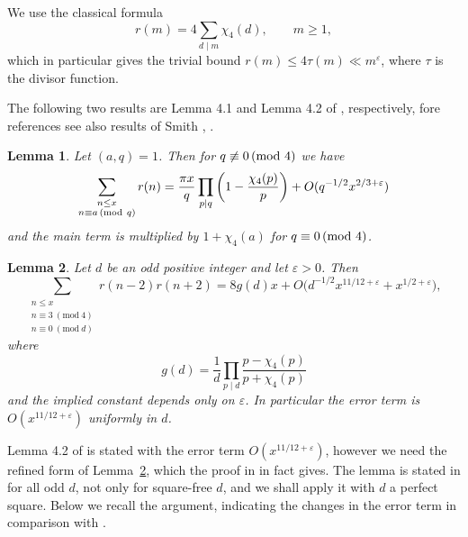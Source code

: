 \documentclass[12pt]{amsart}
\newtheorem{lemma}{Lemma}
\theoremstyle{remark}
\renewcommand{\pmod}[1]{\mkern3mu(\mathrm{mod}\ #1)}
\begin{document}
We use the classical formula
\[
    r(m) = 4\sum_{d \mid m}\chi_4(d), \qquad m \ge 1,
\]
which in particular gives the trivial bound $r(m) \le 4 \tau(m) \ll  m^{\varepsilon}$, where $\tau$ is the divisor function.

The following two results are Lemma 4.1 and Lemma 4.2 of \cite{MR2486486}, respectively, fore references see also results of Smith \cite{MR232741}, \cite{MR249377}.

\begin{lemma}\label{rinAps}
	Let $(a,q)=1$. 
	Then for $q \not\equiv 0 \pmod 4$ we have
	\[
		\sum_{\substack{n \leq x \\ n \equiv a \pmod q}} r(n) = \frac{\pi x}{q}\prod_{p \mid q} \left(1-\frac{\chi_4(p)}{p}\right) + O (q^{-1/2}x^{2/3+\varepsilon})
	\]		
and the main term is multiplied by $1+\chi_4(a)$ for $q \equiv 0 \pmod 4$.
\end{lemma} 

\begin{lemma} \label{convr}
    Let $d$ be an odd positive integer and let $\varepsilon > 0$. Then
    \[
        \sum_{\substack{n\le x\\ n\equiv3\ (\mathrm{mod}\ 4)\\ n\equiv0\ (\mathrm{mod}\ d)}}r(n-2)r(n+2) = 8g(d)x+O\big(d^{-1/2}x^{11/12+\varepsilon}+x^{1/2+\varepsilon}\big),
    \]
    where
    \[
        g(d) = \frac{1}{d} \prod_{p\mid d}\frac{p-\chi_4(p)}{p+\chi_4(p)}
    \]
    and the implied constant depends only on $\varepsilon$. 
    In particular the error term is $O(x^{11/12+\varepsilon})$ uniformly in $d$.
\end{lemma}

Lemma 4.2 of \cite{MR2486486} is stated with the error term $O(x^{11/12+\varepsilon})$, however we need the refined form of Lemma~\ref{convr}, which the proof in \cite{MR2486486} in fact
gives. 
The lemma is stated in \cite{MR2486486} for all odd $d$, not only for square-free $d$, and we shall apply it with $d$ a perfect square. 
Below we recall the argument, indicating the changes in the error term in comparison with \cite{MR2486486}. 
\end{document}
